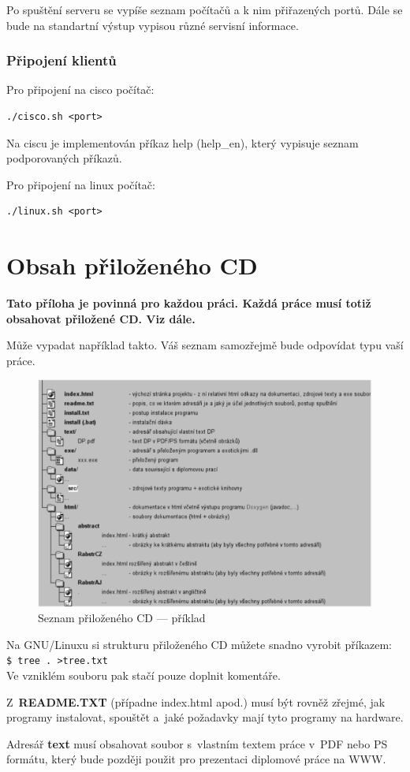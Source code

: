 \documentclass[11pt,twoside,a4paper]{book}
\begin{document}
Po spuštění serveru se vypíše seznam počítačů a k nim přiřazených portů.
Dále se bude na standartní výstup vypisou různé servisní informace.

\subsection{Připojení klientů} 
Pro připojení na cisco počítač:
\begin{verbatim}
./cisco.sh <port> 
\end{verbatim} 

Na ciscu je implementován příkaz help (help\_en), který vypisuje seznam podporovaných příkazů.

Pro připojení na linux počítač:
\begin{verbatim}
./linux.sh <port>
\end{verbatim} 



\chapter{Obsah přiloženého CD}
\textbf{\large Tato příloha je povinná pro každou práci. Každá práce musí totiž obsahovat přiložené CD. Viz dále.}

Může vypadat například takto. Váš seznam samozřejmě bude odpovídat typu vaší práce. %

\begin{figure}[h]
\begin{center}
\includegraphics[width=14cm]{figures/seznamcd}
\caption{Seznam přiloženého CD --- příklad}
\label{fig:seznamcd}
\end{center}
\end{figure}

Na GNU/Linuxu si strukturu přiloženého CD můžete snadno vyrobit příkazem:\\ 
\verb|$ tree . >tree.txt|\\
Ve vzniklém souboru pak stačí pouze doplnit komentáře.

Z~\textbf{README.TXT} (případne index.html apod.)  musí být rovněž zřejmé, jak programy instalovat, spouštět a~jaké
požadavky mají tyto programy na hardware.

Adresář \textbf{text}  musí obsahovat soubor s~vlastním textem práce v~PDF nebo PS formátu, který bude později použit
pro prezentaci diplomové práce na WWW.
\end{document}
